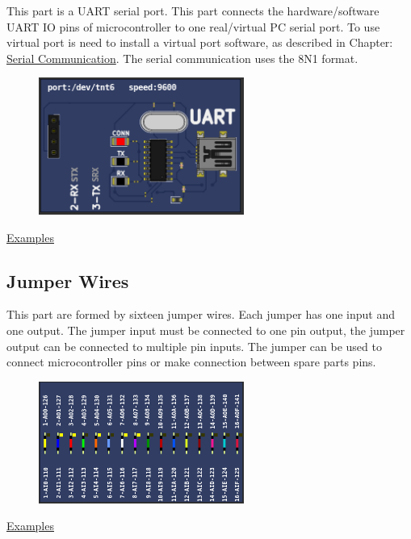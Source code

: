 This part is a UART serial port. This part connects the hardware/software UART IO pins of microcontroller to
one real/virtual PC serial port. To use virtual port is need to install a virtual port software, as 
described in Chapter: \hyperlink{def:seriali}{Serial Communication}. 
The serial communication uses the 8N1 format.

\begin{figure}[H]
\center
\includegraphics[width=0.6\textwidth]{img/part_uart.png} 
\end{figure} 

\href{https://lcgamboa.github.io/picsimlab_examples/parts_IO_UART.html}{Examples}


\subsection{Jumper Wires}

This part are formed by sixteen jumper wires. Each jumper has one input and one output.  The jumper input must be connected to one pin output, 
the jumper output can be connected to multiple pin inputs. The jumper can be used to connect microcontroller pins or make connection between 
spare parts pins.   

\begin{figure}[H]
\center
\includegraphics[width=0.6\textwidth]{img/part_jumper.png} 
\end{figure} 

\href{https://lcgamboa.github.io/picsimlab_examples/parts_Jumper_Wires.html}{Examples}


